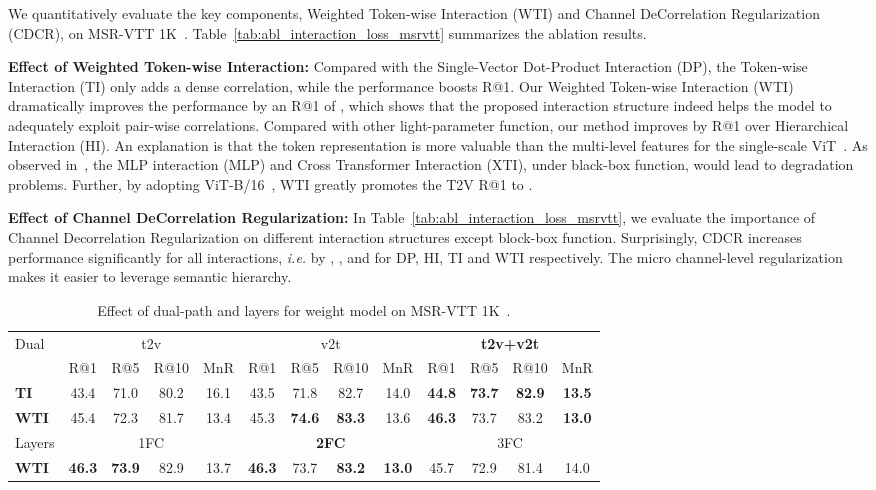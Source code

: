 \documentclass[runningheads]{llncs}
\begin{document}
We quantitatively evaluate the key components, Weighted Token-wise Interaction (WTI) and Channel DeCorrelation Regularization (CDCR), on MSR-VTT 1K~\cite{msrvtt}.
Table~\ref{tab:abl_interaction_loss_msrvtt} summarizes the ablation results.

\noindent\textbf{Effect of Weighted Token-wise Interaction:} 
Compared with the Single-Vector Dot-Product Interaction (DP), the Token-wise Interaction (TI) only adds a dense correlation, while the performance boosts  R@1. 
Our Weighted Token-wise Interaction (WTI) dramatically improves the performance by an R@1 of , which shows that the proposed interaction structure indeed helps the model to adequately exploit pair-wise correlations.
Compared with other light-parameter function, our method improves by  R@1 over Hierarchical Interaction (HI).
An explanation is that the token representation is more valuable than the multi-level features for the single-scale ViT~\cite{vit}.
As observed in~\cite{clip4clip}, the MLP interaction (MLP) and Cross Transformer Interaction (XTI), under black-box function, would lead to degradation problems.
Further, by adopting ViT-B/16~\cite{clip}, WTI greatly promotes the T2V R@1 to .

\noindent\textbf{Effect of Channel DeCorrelation Regularization:} 
In Table~\ref{tab:abl_interaction_loss_msrvtt}, we evaluate the importance of Channel Decorrelation Regularization on different interaction structures except block-box function.
Surprisingly, CDCR increases performance significantly for all interactions, \textit{i.e.} by , ,  and  for DP, HI, TI and WTI respectively.
The micro channel-level regularization makes it easier to leverage semantic hierarchy.
\begin{table}[t]
\centering
\caption{Effect of dual-path and layers for weight model on MSR-VTT 1K~\cite{msrvtt}.  }
\vspace*{-2mm}
\setlength{\tabcolsep}{0.7pt}
\begin{tabular}{lcccccccccccc}
\toprule
 \multirow{2}{*}{Dual}
  & \multicolumn{4}{c}{t2v}& \multicolumn{4}{c}{v2t}& \multicolumn{4}{c}{\textbf{t2v+v2t}}\\
 \cmidrule(r){2-5}
 \cmidrule(r){6-9}
  \cmidrule(r){10-13}
 & R@1 & R@5& R@10 & MnR &  R@1 & R@5 & R@10 & MnR &  R@1 & R@5 & R@10 & MnR\\   
\hline
\textbf{TI}  & 43.4  &  71.0  & 80.2  & 16.1 & 43.5  &  71.8  & 82.7  & 14.0 & \textbf{44.8}  &  \textbf{73.7}  & \textbf{82.9}  & \textbf{13.5}\\
\textbf{WTI} & 45.4  & 72.3  & 81.7  & 13.4 & 45.3  & \textbf{74.6}  & \textbf{83.3}  & 13.6 & \textbf{46.3}  &  73.7  & 83.2  & \textbf{13.0}\\
\bottomrule
Layers & \multicolumn{4}{c}{1FC}& \multicolumn{4}{c}{\textbf{2FC}}& \multicolumn{4}{c}{3FC}\\ 
\hline
\textbf{WTI} & \textbf{46.3}  & \textbf{73.9}  & 82.9  & 13.7 & \textbf{46.3} & 73.7  & \textbf{83.2}  & \textbf{13.0} & 45.7  &  72.9  & 81.4  & 14.0\\
\bottomrule
\end{tabular}
\label{tab:abl_dual_msrvtt}
\vspace{-2mm}
\end{table}
\end{document}
